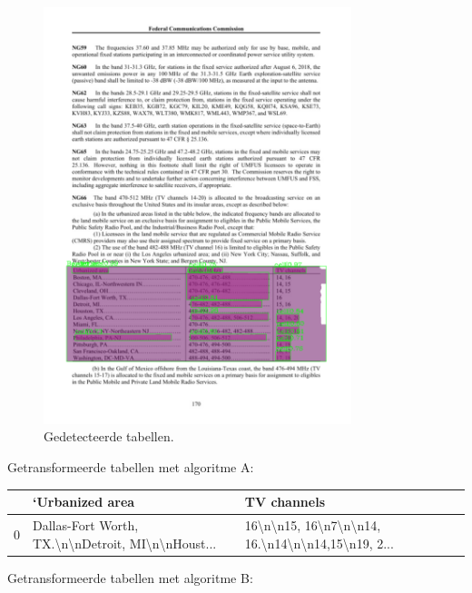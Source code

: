 \begin{figure}[H]
    \centering
    \includegraphics[width=0.8\textwidth]{test-resultaten/6/detected_tables.png}
    \caption{Gedetecteerde tabellen.}
\end{figure}

Getransformeerde tabellen met algoritme A:

\begin{tabular}{lll}
\toprule
{} &                                    ‘Urbanized area &                                        TV channels \\
\midrule
0 &  Dallas-Fort Worth, TX.\textbackslash n\textbackslash nDetroit, MI\textbackslash n\textbackslash nHoust... &  16\textbackslash n\textbackslash n15, 16\textbackslash n7\textbackslash n\textbackslash n14, 16.\textbackslash n14\textbackslash n\textbackslash n14,15\textbackslash n19, 2... \\
\bottomrule
\end{tabular}

Getransformeerde tabellen met algoritme B:

